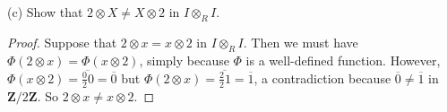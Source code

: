 \documentclass[10pt]{article}
\newcommand{\Z}{\mathbf{Z}}
\renewcommand{\bar}{\overline}
\begin{document}
\begin{enumerate}
(c) Show that $2 \otimes X \neq X \otimes 2$ in $I \otimes_R I$.
\begin{proof}
Suppose that $2 \otimes x = x \otimes 2$ in $I \otimes_R I$.  Then we must have $\Phi(2 \otimes x) = \Phi(x \otimes 2)$, simply because $\Phi$ is a well-defined function.  However, $\Phi(x \otimes 2) = \bar{\frac{0}{2}0} = \bar{0}$ but $\Phi(2 \otimes x) = \bar{\frac{2}{2}1} = \bar{1}$, a contradiction because $\bar{0} \neq \bar{1}$ in $\Z / 2\Z$.  So $2 \otimes x \neq x \otimes 2$.
\end{proof}

\end{enumerate}
\end{document}
